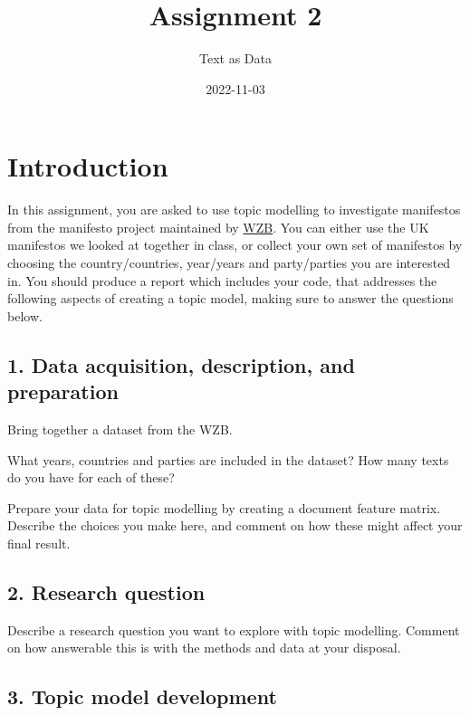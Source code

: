 \documentclass[
]{article}
\title{Assignment 2}
\author{Text as Data}
\date{2022-11-03}
\begin{document}
\maketitle

\hypertarget{introduction}{%
\section{Introduction}\label{introduction}}

In this assignment, you are asked to use topic modelling to investigate
manifestos from the manifesto project maintained by
\href{https://manifesto-project.wzb.eu/}{WZB}. You can either use the UK
manifestos we looked at together in class, or collect your own set of
manifestos by choosing the country/countries, year/years and
party/parties you are interested in. You should produce a report which
includes your code, that addresses the following aspects of creating a
topic model, making sure to answer the questions below.

\hypertarget{data-acquisition-description-and-preparation}{%
\subsection{1. Data acquisition, description, and
preparation}\label{data-acquisition-description-and-preparation}}

Bring together a dataset from the WZB.

What years, countries and parties are included in the dataset? How many
texts do you have for each of these?

Prepare your data for topic modelling by creating a document feature
matrix. Describe the choices you make here, and comment on how these
might affect your final result.

\hypertarget{research-question}{%
\subsection{2. Research question}\label{research-question}}

Describe a research question you want to explore with topic modelling.
Comment on how answerable this is with the methods and data at your
disposal.

\hypertarget{topic-model-development}{%
\subsection{3. Topic model development}\label{topic-model-development}}
\end{document}
